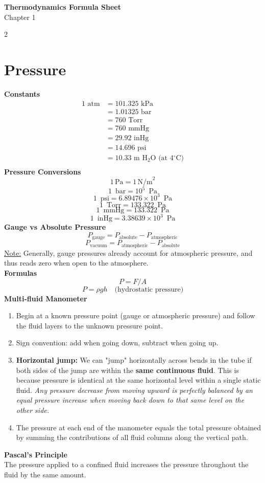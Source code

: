 \documentclass[10pt, fleqn]{article}
\begin{document}
\begin{center}
    \Large \textbf{Thermodynamics Formula Sheet} \\
    \normalsize Chapter 1
\end{center}

\begin{multicols}{2}

\section*{Pressure}
\textbf{Constants}
\[\begin{aligned}
1 \text{ atm} &= 101.325 \text{ kPa} \\
&= 1.01325 \text{ bar} \\
&= 760 \text{ Torr} \\
&= 760 \text{ mmHg} \\
&= 29.92 \text{ inHg} \\
&= 14.696 \text{ psi}\\
&= 10.33 \text{ m H}_2\text{O (at 4$^\circ$C)} \\
\end{aligned}\]
\textbf{Pressure Conversions}
\[1\,\text{Pa} = 1\,\text{N/m}^2\]
\[1\, \text{ bar} = 10^{5}\, \text{ Pa}\]
\[1\, \text{ psi} = 6.89476 \times 10^{3}\, \text{ Pa}\]
\[1\, \text{ Torr} = 133.322\, \text{ Pa}\]
\[1\, \text{ mmHg} = 133.322\, \text{ Pa}\]
\[1\, \text{ inHg} = 3.38639 \times 10^{3}\, \text{ Pa}\]
\textbf{Gauge vs Absolute Pressure}
\[P_{\text{gauge}} = P_{\text{absolute}} - P_{\text{atmospheric}}\]
\[P_{\text{vacuum}} = P_{\text{atmospheric}} - P_{\text{absolute}}\]
\underline{Note:} Generally, gauge pressures already account for atmospheric pressure, and thus reads zero when open to the atmosphere.\\
\textbf{Formulas}
\[P=F/A\]
\[P = \rho g h\quad \text{(hydrostatic pressure)}\]
\textbf{Multi-fluid Manometer}
\begin{enumerate}
    \item Begin at a known pressure point (gauge or atmospheric pressure) and follow the fluid layers to the unknown pressure point.
    \item Sign convention: add when going down, subtract when going up.
    \item \textbf{Horizontal jump:} We can "jump" horizontally across bends in the tube if both sides of the jump are within the \textbf{same continuous fluid}. This is because pressure is identical at the same horizontal level within a single static fluid. \textit{Any pressure decrease from moving upward is perfectly balanced by an equal pressure increase when moving back down to that same level on the other side.}
    \item The pressure at each end of the manometer equals the total pressure obtained by summing the contributions of all fluid columns along the vertical path.
\end{enumerate}
\textbf{Pascal's Principle}\\
The pressure applied to a confined fluid increases the pressure throughout the fluid by the same amount.
\newcolumn

\end{multicols}
\end{document}
